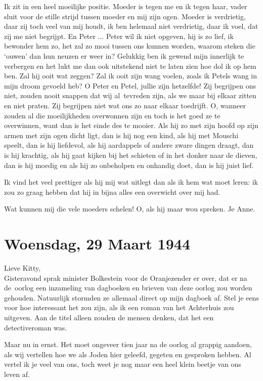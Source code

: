 \documentclass{book}
\begin{document}
Ik zit in een heel moeilijke positie. Moeder is tegen me en ik tegen
haar, vader sluit voor de stille strijd tussen moeder en mij zijn ogen.
Moeder is verdrietig, daar zij toch veel van mij houdt, ik ben helemaal
niet verdrietig, daar ik voel, dat zij me niet begrijpt. En Peter ...
Peter wil ik niet opgeven, hij is zo lief, ik bewonder hem zo, het zal
zo mooi tussen ons kunnen worden, waarom steken die `ouwen' dan hun
neuzen er weer in? Gelukkig ben ik gewend mijn innerlijk te verbergen en
het lukt me dan ook uitstekend niet te laten zien hoe dol ik op hem ben.
Zal hij ooit wat zeggen? Zal ik ooit zijn wang voelen, zoals ik Petels
wang in mijn droom gevoeld heb? O Peter en Petel, jullie zijn hetzelfde!
Zij begrijpen ons niet, zouden nooit snappen dat wij al~tevreden zijn,
als we maar bij elkaar zitten en niet praten. Zij begrijpen niet wat ons
zo naar elkaar toedrijft. O, wanneer zouden al die moeilijkheden
overwonnen zijn en toch is het goed ze te overwinnen, want dan is het
einde des te mooier. Als hij zo met zijn hoofd op zijn armen met zijn
ogen dicht ligt, dan is hij nog een kind, als hij met Mouschi speelt,
dan is hij liefdevol, als hij aardappels of andere zware dingen draagt,
dan is hij krachtig, als hij gaat kijken bij het schieten of in het
donker naar de dieven, dan is hij moedig en als hij zo onbeholpen en
onhandig doet, dan is hij juist lief.

Ik vind het veel prettiger als hij mij wat uitlegt dan als ik hem wat
moet leren: ik zou zo graag hebben dat hij in bijna alles een overwicht
over mij had.

Wat kunnen mij die vele moeders schelen! O, als hij maar wou spreken. Je
Anne.

\chapter{Woensdag, 29 Maart 1944}

Lieve Kitty,\\Gisteravond sprak minister Bolkestein voor de Oranjezender
er over, dat er na de~oorlog een inzameling van dagboeken en brieven van
deze oorlog zou worden gehouden. Natuurlijk stormden ze allemaal direct
op mijn dagboek af. Stel je eens voor hoe interessant het zou zijn, als
ik een roman van het Achterhuis zou uitgeven. Aan de titel alleen zouden
de mensen denken, dat het een detectiveroman was.

Maar nu in ernst. Het moet ongeveer tien jaar na de oorlog al grappig
aandoen, als wij vertellen hoe we als Joden hier geleefd, gegeten en
gesproken hebben. Al vertel ik je veel van ons, toch weet je nog maar
een heel klein beetje van ons leven af.
\end{document}
